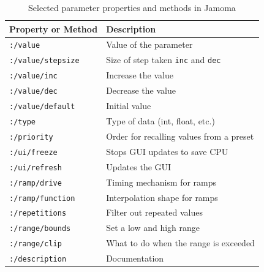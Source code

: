 \documentclass{article}
\begin{document}
\begin{table}[ht]
\begin{center}
\footnotesize\noindent
\begin{tabular}{| l | p{4.5cm} |}
    \hline
    \textbf{Property or Method}          & \textbf{Description}\\ 
	\hline
	\texttt{:/value}			& Value of the parameter \\
	\hline
	\texttt{:/value/stepsize}	& Size of step taken \texttt{inc} and \texttt{dec} \\
	\hline
	\texttt{:/value/inc}		& Increase the value \\
	\hline
	\texttt{:/value/dec}		& Decrease the value \\
	\hline
	\texttt{:/value/default}	& Initial value \\
	\hline
	\texttt{:/type} 			& Type of data (int, float, etc.) \\
	\hline
	\texttt{:/priority} 		& Order for recalling values from a preset \\
	\hline
	\texttt{:/ui/freeze} 		& Stops GUI updates to save CPU \\
	\hline
	\texttt{:/ui/refresh} 		& Updates the GUI \\
	\hline
	\texttt{:/ramp/drive} 		& Timing mechanism for ramps \\
	\hline
	\texttt{:/ramp/function} 	& Interpolation shape for ramps \\
	\hline
	\texttt{:/repetitions} 		& Filter out repeated values \\
	\hline
	\texttt{:/range/bounds} 	& Set a low and high range \\
	\hline
	\texttt{:/range/clip} 		& What to do when the range is exceeded \\
	\hline
	\texttt{:/description} 		& Documentation \\
	\hline
\end{tabular}
\end{center}
\caption{Selected parameter properties and methods in Jamoma}
\label{tab:parameter_properties}
\end{table}
\end{document}
